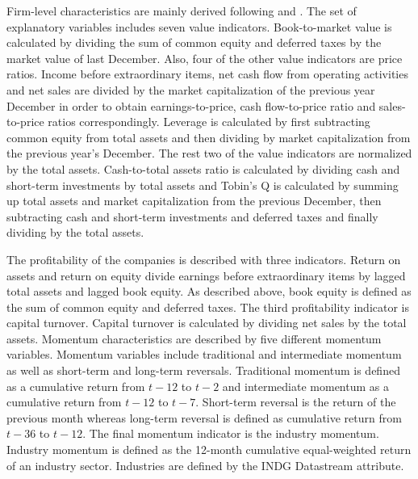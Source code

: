 \documentclass[12pt]{article}
\begin{document}
Firm-level characteristics are mainly derived following \citet{Green2017} and \citet{HANAUER2023}.\footnotemark {} The set of explanatory variables includes seven value indicators. Book-to-market value is calculated by dividing the sum of common equity and deferred taxes by the market value of last December. Also, four of the other value indicators are price ratios. Income before extraordinary items, net cash flow from operating activities and net sales are divided by the market capitalization of the previous year December in order to obtain earnings-to-price, cash flow-to-price ratio and sales-to-price ratios correspondingly. Leverage is calculated by first subtracting common equity from total assets and then dividing by market capitalization from the previous year's December. The rest two of the value indicators are normalized by the total assets. Cash-to-total assets ratio is calculated by dividing cash and short-term investments by total assets and Tobin's Q is calculated by summing up total assets and market capitalization from the previous December, then subtracting cash and short-term investments and deferred taxes and finally dividing by the total assets. \par

The profitability of the companies is described with three indicators. Return on assets and return on equity divide earnings before extraordinary items by lagged total assets and lagged book equity. As described above, book equity is defined as the sum of common equity and deferred taxes. The third profitability indicator is capital turnover. Capital turnover is calculated by dividing net sales by the total assets. Momentum characteristics are described by five different momentum variables. Momentum variables include traditional and intermediate momentum as well as short-term and long-term reversals. Traditional momentum is defined as a cumulative return from $t-12$ to $t-2$ and intermediate momentum as a cumulative return from $t-12$ to $t-7$. Short-term reversal is the return of the previous month whereas long-term reversal is defined as cumulative return from $t-36$ to $t-12$. The final momentum indicator is the industry momentum. Industry momentum is defined as the 12-month cumulative equal-weighted return of an industry sector. Industries are defined by the INDG Datastream attribute. \par
\end{document}
